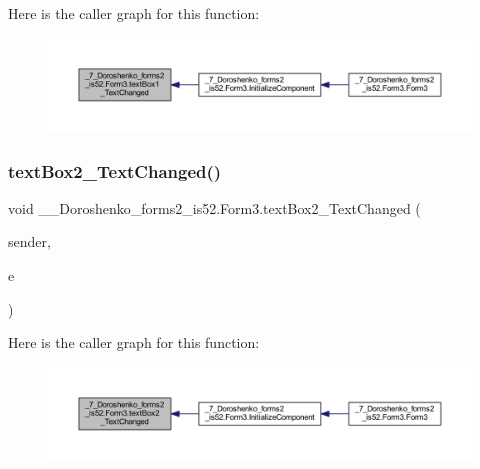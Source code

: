 Here is the caller graph for this function\+:
\nopagebreak
\begin{figure}[H]
\begin{center}
\leavevmode
\includegraphics[width=350pt]{class__7___doroshenko__forms2__is52_1_1_form3_ae0b02381848f523a55ededfae3026c11_icgraph}
\end{center}
\end{figure}
\hypertarget{class__7___doroshenko__forms2__is52_1_1_form3_a99ad5cfebbfe9b80ef66203aaa3d777b}{}\label{class__7___doroshenko__forms2__is52_1_1_form3_a99ad5cfebbfe9b80ef66203aaa3d777b} 
\subsubsection{\texorpdfstring{text\+Box2\+\_\+\+Text\+Changed()}{textBox2\_TextChanged()}}
{\footnotesize\ttfamily void \+\_\+\_\+\+Doroshenko\+\_\+forms2\+\_\+is52.\+Form3.\+text\+Box2\+\_\+\+Text\+Changed (\begin{DoxyParamCaption}\item[{object}]{sender,  }\item[{Event\+Args}]{e }\end{DoxyParamCaption})\hspace{0.3cm}{\ttfamily [private]}}

Here is the caller graph for this function\+:
\nopagebreak
\begin{figure}[H]
\begin{center}
\leavevmode
\includegraphics[width=350pt]{class__7___doroshenko__forms2__is52_1_1_form3_a99ad5cfebbfe9b80ef66203aaa3d777b_icgraph}
\end{center}
\end{figure}
\hypertarget{class__7___doroshenko__forms2__is52_1_1_form3_ad5c48d9a356af6c3e3a9a727ec5c3898}{}\label{class__7___doroshenko__forms2__is52_1_1_form3_ad5c48d9a356af6c3e3a9a727ec5c3898} 
